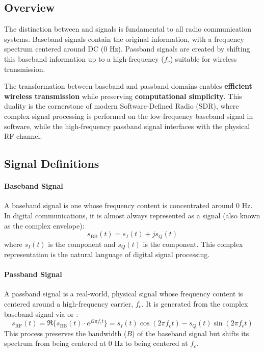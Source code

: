 \subsection{Overview}

The distinction between  and  signals is fundamental to all radio communication systems. Baseband signals contain the original information, with a frequency spectrum centered around DC (0 Hz). Passband signals are created by shifting this baseband information up to a high-frequency  ($f_c$) suitable for wireless transmission.

\begin{keyconcept}
    The transformation between baseband and passband domains enables \textbf{efficient wireless transmission} while preserving \textbf{computational simplicity}. This duality is the cornerstone of modern Software-Defined Radio (SDR), where complex signal processing is performed on the low-frequency baseband signal in software, while the high-frequency passband signal interfaces with the physical RF channel.
\end{keyconcept}


\subsection{Signal Definitions}

\paragraph{Baseband Signal}
A baseband signal is one whose frequency content is concentrated around 0 Hz. In digital communications, it is almost always represented as a  signal (also known as the complex envelope):
\begin{equation}
    s_{\text{BB}}(t) = s_I(t) + js_Q(t)
\end{equation}
where $s_I(t)$ is the  component and $s_Q(t)$ is the  component. This complex representation is the natural language of digital signal processing.

\paragraph{Passband Signal}
A passband signal is a real-world, physical signal whose frequency content is centered around a high-frequency carrier, $f_c$. It is generated from the complex baseband signal via  or :
\begin{equation}
    s_{\text{RF}}(t) = \Re\{s_{\text{BB}}(t) \cdot e^{j2\pi f_c t}\} = s_I(t)\cos(2\pi f_c t) - s_Q(t)\sin(2\pi f_c t)
\end{equation}
This process preserves the bandwidth ($B$) of the baseband signal but shifts its spectrum from being centered at 0 Hz to being centered at $f_c$.


